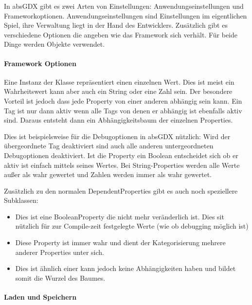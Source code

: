 
In absGDX gibt es zwei Arten von Einstellungen: Anwendungseinstellungen und Frameworkoptionen.
Anwendungseinstellungen sind Einstellungen im eigentlichen Spiel, ihre Verwaltung liegt in der Hand des Entwicklers.
Zusätzlich gibt es verschiedene Optionen die angeben wie das Framework sich verhält. Für beide Dinge werden  Objekte verwendet.

\paragraph{Framework Optionen}

Eine Instanz der Klasse  repräsentiert einen einzelnen Wert. Dies ist meist ein Wahrheitswert kann aber auch ein String oder eine Zahl sein.
Der besondere Vorteil ist jedoch dass jede Property von einer anderen abhängig sein kann. Ein Tag ist nur dann aktiv wenn alle Tags von denen er abhängig ist ebenfalls aktiv sind. Daraus entsteht dann ein Abhängigkeitsbaum der einzelnen Properties.


Dies ist beispielsweise für die Debugoptionen in absGDX nützlich: Wird der übergeordnete Tag  deaktiviert sind auch alle anderen untergeordneten Debugoptionen deaktiviert. 
Ist die Property ein Boolean entscheidet sich ob er aktiv ist einfach mittels seines Wertes. 
Bei String-Properties werden alle Werte außer  als wahr gewertet und Zahlen werden immer als wahr gewertet.

Zusätzlich zu den normalen DependentProperties gibt es auch noch speziellere Subklassen:

\begin{itemize}
\item {} Dies ist eine BooleanProperty die nicht mehr veränderlich ist. Dies sit nützlich für zur Compile-zeit festgelegte Werte (wie ob debugging möglich ist)
\item {} Diese Property ist immer wahr und dient der Kategorisierung mehrere anderer Properties unter sich.
\item {} Dies ist ähnlich einer  kann jedoch keine Abhängigkeiten haben und bildet somit die Wurzel des Baumes.
\end{itemize}

\paragraph{Laden und Speichern}

